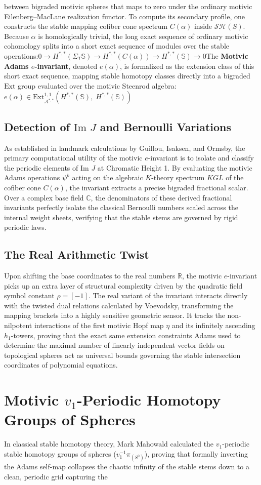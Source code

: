 \documentclass[11pt,oneside]{article}
\begin{document}
between bigraded motivic spheres that maps to zero under the ordinary motivic Eilenberg--MacLane realization functor. To compute its secondary profile, one constructs the stable mapping cofiber cone spectrum $C(\alpha)$ inside $\mathcal{S}\mathcal{H}(S)$. Because $\alpha$ is homologically trivial, the long exact sequence of ordinary motivic cohomology splits into a short exact sequence of modules over the stable operations:\(0\longrightarrow H^{*,*}(\Sigma _{T}\mathbb{S})\longrightarrow H^{*,*}(C(\alpha ))\longrightarrow H^{*,*}(\mathbb{S})\longrightarrow 0\)The \textbf{Motivic Adams $e$-invariant}, denoted $e(\alpha)$, is formalized as the extension class of this short exact sequence, mapping stable homotopy classes directly into a bigraded $\text{Ext}$ group evaluated over the motivic Steenrod algebra:\(e(\alpha )\in \text{Ext}_{\mathcal{A}^{*,*}}^{1,1}\left(H^{*,*}(\mathbb{S}),\;H^{*,*}(\mathbb{S})\right)\)\subsection{Detection of $\text{Im } J$ and Bernoulli Variations}As established in landmark calculations by Guillou, Isaksen, and Ormsby, the primary computational utility of the motivic $e$-invariant is to isolate and classify the periodic elements of $\text{Im } J$ at Chromatic Height 1. By evaluating the motivic Adams operations $\psi^k$ acting on the algebraic $K$-theory spectrum $KGL$ of the cofiber cone $C(\alpha)$, the invariant extracts a precise bigraded fractional scalar. Over a complex base field $\mathbb{C}$, the denominators of these derived fractional invariants perfectly isolate the classical Bernoulli numbers scaled across the internal weight sheets, verifying that the stable stems are governed by rigid periodic laws.\subsection{The Real Arithmetic Twist}Upon shifting the base coordinates to the real numbers $\mathbb{R}$, the motivic $e$-invariant picks up an extra layer of structural complexity driven by the quadratic field symbol constant $\rho = [-1]$. The real variant of the invariant interacts directly with the twisted dual relations calculated by Voevodsky, transforming the mapping brackets into a highly sensitive geometric sensor. It tracks the non-nilpotent interactions of the first motivic Hopf map $\eta$ and its infinitely ascending $h_1$-towers, proving that the exact same extension constraints Adams used to determine the maximal number of linearly independent vector fields on topological spheres act as universal bounds governing the stable intersection coordinates of polynomial equations.\section{Motivic $v_1$-Periodic Homotopy Groups of Spheres}In classical stable homotopy theory, Mark Mahowald calculated the $v_1$-periodic stable homotopy groups of spheres ($v_1^{-1}\pi_(S^0)$), proving that formally inverting the Adams self-map collapses the chaotic infinity of the stable stems down to a clean, periodic grid capturing the 
\end{document}
